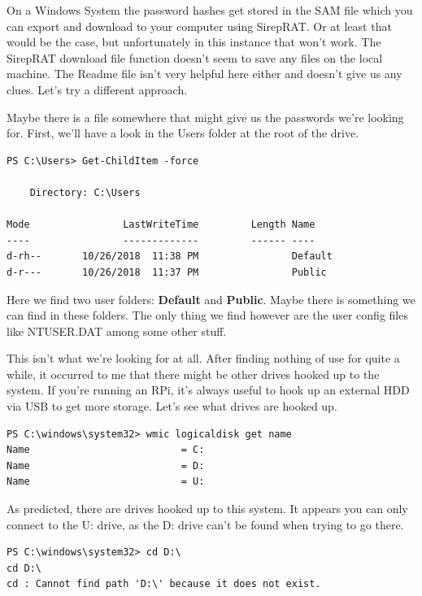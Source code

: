 \documentclass[../main.tex]{subfiles}
\begin{document}
On a Windows System the password hashes get stored in the SAM file which you can export and download to your computer using SirepRAT. Or at least that would be the case, but unfortunately in this instance that won't work. The SirepRAT download file function doesn't seem to save any files on the local machine. The Readme file isn't very helpful here either and doesn't give us any clues. Let's try a different approach.

Maybe there is a file somewhere that might give us the passwords we're looking for. First, we'll have a look in the Users folder at the root of the drive.

\begin{lstlisting}
PS C:\Users> Get-ChildItem -force

    Directory: C:\Users

Mode                LastWriteTime         Length Name                          
----                -------------         ------ ----                          
d-rh--       10/26/2018  11:38 PM                Default                       
d-r---       10/26/2018  11:37 PM                Public
\end{lstlisting}

Here we find two user folders: \textbf{Default} and \textbf{Public}. Maybe there is something we can find in these folders. The only thing we find however are the user config files like NTUSER.DAT among some other stuff.

This isn't what we're looking for at all. After finding nothing of use for quite a while, it occurred to me that there might be other drives hooked up to the system. If you're running an RPi, it's always useful to hook up an external HDD via USB to get more storage. Let's see what drives are hooked up.

\begin{lstlisting}
PS C:\windows\system32> wmic logicaldisk get name
Name                          = C:
Name                          = D:
Name                          = U:
\end{lstlisting}

As predicted, there are drives hooked up to this system. It appears you can only connect to the U: drive, as the D: drive can't be found when trying to go there.

\begin{lstlisting}
PS C:\windows\system32> cd D:\
cd D:\
cd : Cannot find path 'D:\' because it does not exist.
\end{lstlisting}
\end{document}
